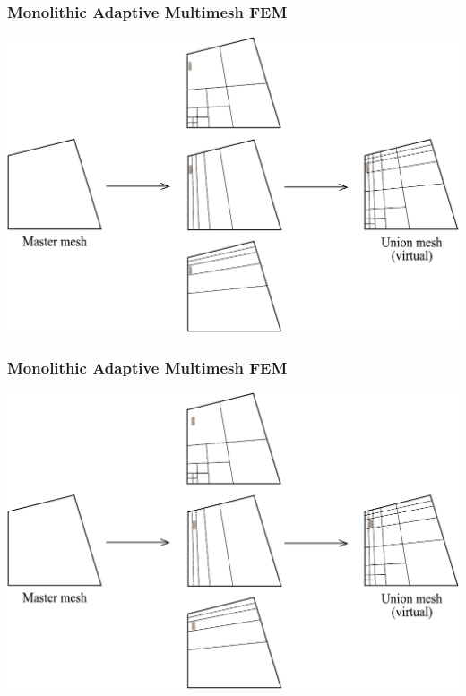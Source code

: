 \begin{frame}
  \frametitle{Monolithic Adaptive Multimesh FEM}
  \begin{center}
    \includegraphics[height=0.7\textheight]{multimesh/mm_20.pdf}
  \end{center}
\end{frame}

\begin{frame}
  \frametitle{Monolithic Adaptive Multimesh FEM}
  \begin{center}
    \includegraphics[height=0.7\textheight]{multimesh/mm_21.pdf}
  \end{center}
\end{frame}

